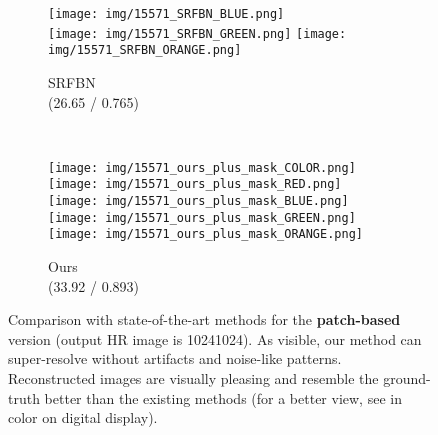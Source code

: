 \documentclass[10pt,twocolumn,letterpaper]{article}
\begin{document}
\begin{figure*}[t]
\begin{center}
\begin{subfigure}[b]{\SizeFigCompareHRLarge\textwidth}
        \texttt{[image: img/15571\_SRFBN\_BLUE.png]}
        \\
        \texttt{[image: img/15571\_SRFBN\_GREEN.png]}
        \texttt{[image: img/15571\_SRFBN\_ORANGE.png]}
        \caption{SRFBN~\cite{li2019feedback} \\ (26.65 / 0.765)}
        \label{fig:SRFBN}
    \end{subfigure}
    ~
    \begin{subfigure}[b]{\SizeFigCompareHRLarge\textwidth}
        \texttt{[image: img/15571\_ours\_plus\_mask\_COLOR.png]}
        \\
        \texttt{[image: img/15571\_ours\_plus\_mask\_RED.png]}
        \texttt{[image: img/15571\_ours\_plus\_mask\_BLUE.png]}
        \\
        \texttt{[image: img/15571\_ours\_plus\_mask\_GREEN.png]}
        \texttt{[image: img/15571\_ours\_plus\_mask\_ORANGE.png]}
        \caption{Ours \\ (33.92 / 0.893)}
        \label{fig:ours}
    \end{subfigure}
\end{center}
\vspace{-5mm}
\caption{Comparison with state-of-the-art methods for the \textbf{patch-based} version (output HR image is 10241024). As visible, our method can super-resolve without artifacts and noise-like patterns. Reconstructed images are visually pleasing and resemble the ground-truth better than the existing methods (for a better view, see in color on digital display). }
\label{fig:comparison}
\end{figure*}
\end{document}
